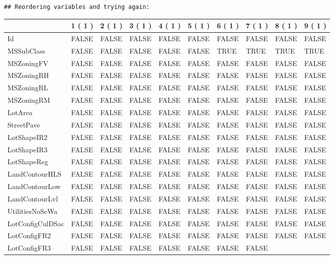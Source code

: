 \documentclass[]{article}
\newenvironment{Shaded}{\begin{snugshade}}{\end{snugshade}}
\newcommand{\KeywordTok}[1]{\textcolor[rgb]{0.13,0.29,0.53}{\textbf{{#1}}}}
\newcommand{\DataTypeTok}[1]{\textcolor[rgb]{0.13,0.29,0.53}{{#1}}}
\newcommand{\StringTok}[1]{\textcolor[rgb]{0.31,0.60,0.02}{{#1}}}
\newcommand{\OtherTok}[1]{\textcolor[rgb]{0.56,0.35,0.01}{{#1}}}
\newcommand{\NormalTok}[1]{{#1}}
\begin{document}
\begin{verbatim}
## Reordering variables and trying again:
\end{verbatim}

\begin{Shaded}
\end{Shaded}

\begin{longtable}[]{@{}llllllllll@{}}
\toprule
& 1 ( 1 ) & 2 ( 1 ) & 3 ( 1 ) & 4 ( 1 ) & 5 ( 1 ) & 6 ( 1 ) & 7 ( 1 ) &
8 ( 1 ) & 9 ( 1 )\tabularnewline
\midrule
\endhead
Id & FALSE & FALSE & FALSE & FALSE & FALSE & FALSE & FALSE & FALSE &
FALSE\tabularnewline
MSSubClass & FALSE & FALSE & FALSE & FALSE & FALSE & TRUE & TRUE & TRUE
& TRUE\tabularnewline
MSZoningFV & FALSE & FALSE & FALSE & FALSE & FALSE & FALSE & FALSE &
FALSE & FALSE\tabularnewline
MSZoningRH & FALSE & FALSE & FALSE & FALSE & FALSE & FALSE & FALSE &
FALSE & FALSE\tabularnewline
MSZoningRL & FALSE & FALSE & FALSE & FALSE & FALSE & FALSE & FALSE &
FALSE & FALSE\tabularnewline
MSZoningRM & FALSE & FALSE & FALSE & FALSE & FALSE & FALSE & FALSE &
FALSE & FALSE\tabularnewline
LotArea & FALSE & FALSE & FALSE & FALSE & FALSE & FALSE & FALSE & FALSE
& FALSE\tabularnewline
StreetPave & FALSE & FALSE & FALSE & FALSE & FALSE & FALSE & FALSE &
FALSE & FALSE\tabularnewline
LotShapeIR2 & FALSE & FALSE & FALSE & FALSE & FALSE & FALSE & FALSE &
FALSE & FALSE\tabularnewline
LotShapeIR3 & FALSE & FALSE & FALSE & FALSE & FALSE & FALSE & FALSE &
FALSE & FALSE\tabularnewline
LotShapeReg & FALSE & FALSE & FALSE & FALSE & FALSE & FALSE & FALSE &
FALSE & FALSE\tabularnewline
LandContourHLS & FALSE & FALSE & FALSE & FALSE & FALSE & FALSE & FALSE &
FALSE & FALSE\tabularnewline
LandContourLow & FALSE & FALSE & FALSE & FALSE & FALSE & FALSE & FALSE &
FALSE & FALSE\tabularnewline
LandContourLvl & FALSE & FALSE & FALSE & FALSE & FALSE & FALSE & FALSE &
FALSE & FALSE\tabularnewline
UtilitiesNoSeWa & FALSE & FALSE & FALSE & FALSE & FALSE & FALSE & FALSE
& FALSE & FALSE\tabularnewline
LotConfigCulDSac & FALSE & FALSE & FALSE & FALSE & FALSE & FALSE & FALSE
& FALSE & FALSE\tabularnewline
LotConfigFR2 & FALSE & FALSE & FALSE & FALSE & FALSE & FALSE & FALSE &
FALSE & FALSE\tabularnewline
LotConfigFR3 & FALSE & FALSE & FALSE & FALSE & FALSE & FALSE & FALSE &

\end{longtable}
\end{document}
